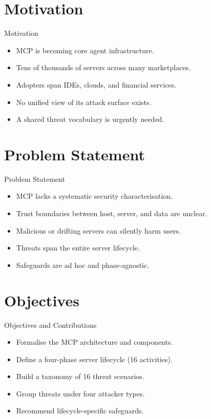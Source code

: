 \documentclass{beamer}
\begin{document}
\section{Motivation}
\begin{frame}{Motivation}
\begin{itemize}
  \item MCP is becoming core agent infrastructure.
  \item Tens of thousands of servers across many marketplaces.
  \item Adopters span IDEs, clouds, and financial services.
  \item No unified view of its attack surface exists.
  \item A shared threat vocabulary is urgently needed.
\end{itemize}
\end{frame}

\section{Problem Statement}
\begin{frame}{Problem Statement}
\begin{itemize}
  \item MCP lacks a systematic security characterisation.
  \item Trust boundaries between host, server, and data are unclear.
  \item Malicious or drifting servers can silently harm users.
  \item Threats span the entire server lifecycle.
  \item Safeguards are ad hoc and phase-agnostic.
\end{itemize}
\end{frame}

\section{Objectives}
\begin{frame}{Objectives and Contributions}
\begin{itemize}
  \item Formalise the MCP architecture and components.
  \item Define a four-phase server lifecycle (16 activities).
  \item Build a taxonomy of 16 threat scenarios.
  \item Group threats under four attacker types.
  \item Recommend lifecycle-specific safeguards.
\end{itemize}
\end{frame}
\end{document}
